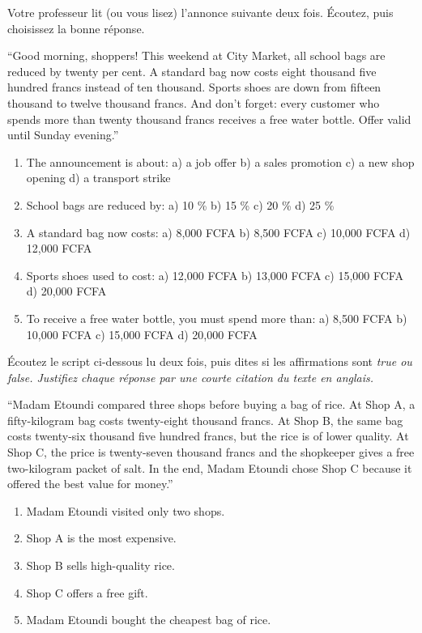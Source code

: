 \documentclass[11pt]{article}
\newcommand{\eng}[1]{\ifmmode\text{\textit{#1}}\else\begingroup\selectlanguage{english}\itshape #1\endgroup\fi}
\begin{document}
\begin{exercice}
Votre professeur lit (ou vous lisez) l'annonce suivante deux fois. Écoutez, puis choisissez la bonne réponse.

\begin{textebox}
“Good morning, shoppers! This weekend at City Market, all school bags are reduced by twenty per cent. A standard bag now costs eight thousand five hundred francs instead of ten thousand. Sports shoes are down from fifteen thousand to twelve thousand francs. And don't forget: every customer who spends more than twenty thousand francs receives a free water bottle. Offer valid until Sunday evening.”
\end{textebox}

\begin{enumerate}
\item The announcement is about: \quad a) a job offer \quad b) a sales promotion \quad c) a new shop opening \quad d) a transport strike
\item School bags are reduced by: \quad a) 10 \% \quad b) 15 \% \quad c) 20 \% \quad d) 25 \%
\item A standard bag now costs: \quad a) 8,000 FCFA \quad b) 8,500 FCFA \quad c) 10,000 FCFA \quad d) 12,000 FCFA
\item Sports shoes used to cost: \quad a) 12,000 FCFA \quad b) 13,000 FCFA \quad c) 15,000 FCFA \quad d) 20,000 FCFA
\item To receive a free water bottle, you must spend more than: \quad a) 8,500 FCFA \quad b) 10,000 FCFA \quad c) 15,000 FCFA \quad d) 20,000 FCFA
\end{enumerate}
\end{exercice}

\begin{exercice}
Écoutez le script ci-dessous lu deux fois, puis dites si les affirmations sont \eng{true} ou \eng{false}. Justifiez chaque réponse par une courte citation du texte en anglais.

\begin{textebox}
“Madam Etoundi compared three shops before buying a bag of rice. At Shop A, a fifty-kilogram bag costs twenty-eight thousand francs. At Shop B, the same bag costs twenty-six thousand five hundred francs, but the rice is of lower quality. At Shop C, the price is twenty-seven thousand francs and the shopkeeper gives a free two-kilogram packet of salt. In the end, Madam Etoundi chose Shop C because it offered the best value for money.”
\end{textebox}

\begin{enumerate}
\item Madam Etoundi visited only two shops.
\item Shop A is the most expensive.
\item Shop B sells high-quality rice.
\item Shop C offers a free gift.
\item Madam Etoundi bought the cheapest bag of rice.
\end{enumerate}
\end{exercice}
\end{document}
